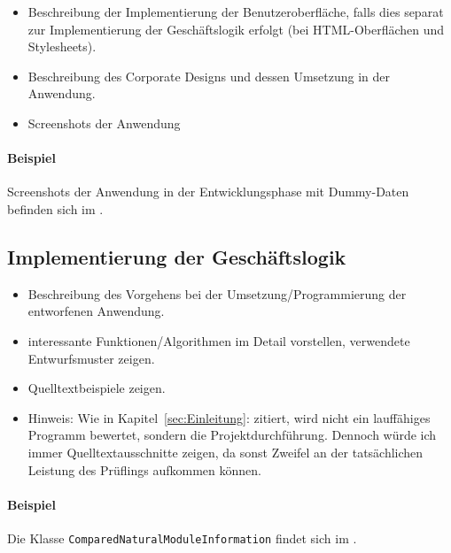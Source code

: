 \begin{itemize}
	\item Beschreibung der Implementierung der Benutzeroberfläche, falls dies separat zur Implementierung der Geschäftslogik erfolgt (\zB bei \acs{HTML}-Oberflächen und Stylesheets).
	\item \Ggfs Beschreibung des Corporate Designs und dessen Umsetzung in der Anwendung.
	\item Screenshots der Anwendung
\end{itemize}

\paragraph{Beispiel}
Screenshots der Anwendung in der Entwicklungsphase mit Dummy-Daten befinden sich im .


\subsection{Implementierung der Geschäftslogik}
\label{sec:ImplementierungGeschaeftslogik}

\begin{itemize}
	\item Beschreibung des Vorgehens bei der Umsetzung/Programmierung der entworfenen Anwendung.
	\item \Ggfs interessante Funktionen/Algorithmen im Detail vorstellen, verwendete Entwurfsmuster zeigen.
	\item Quelltextbeispiele zeigen.
	\item Hinweis: Wie in Kapitel~\ref{sec:Einleitung}:  zitiert, wird nicht ein lauffähiges Programm bewertet, sondern die Projektdurchführung. Dennoch würde ich immer Quelltextausschnitte zeigen, da sonst Zweifel an der tatsächlichen Leistung des Prüflings aufkommen können.
\end{itemize}

\paragraph{Beispiel}
Die Klasse \texttt{Com\-par\-ed\-Na\-tu\-ral\-Mo\-dule\-In\-for\-ma\-tion} findet sich im .  